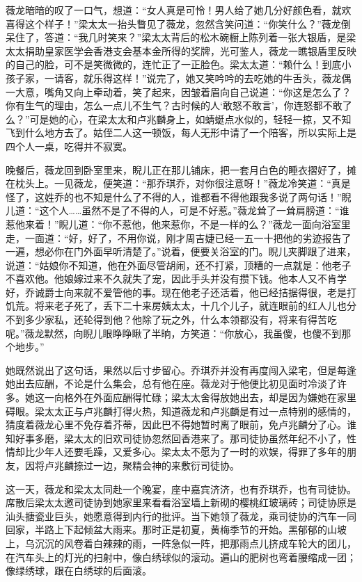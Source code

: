 \par 薇龙暗暗的叹了一口气，想道：“女人真是可怜！男人给了她几分好颜色看，就欢喜得这个样子！”梁太太一抬头瞥见了薇龙，忽然含笑问道：“你笑什么？”薇龙倒呆住了，答道：“我几时笑来？”梁太太背后的松木碗橱上陈列着一张大银盾，是梁太太捐助皇家医学会香港支会基本金所得的奖牌，光可鉴人，薇龙一瞧银盾里反映的自己的脸，可不是笑微微的，连忙正了一正脸色。梁太太道：“赖什么！到底小孩子家，一请客，就乐得这样！”说完了，她又笑吟吟的去吃她的牛舌头，薇龙偶一大意，嘴角又向上牵动着，笑了起来，因皱着眉向自己说道：“你这是怎么了？你有生气的理由，怎么一点儿不生气？古时候的人‘敢怒不敢言’，你连怒都不敢了么？”可是她的心，在梁太太和卢兆麟身上，如蜻蜓点水似的，轻轻一掠，又不知飞到什么地方去了。姑侄二人这一顿饭，每人无形中请了一个陪客，所以实际上是四个人一桌，吃得并不寂寞。
\par 晚餐后，薇龙回到卧室里来，睨儿正在那儿铺床，把一套月白色的睡衣摺好了，摊在枕头上。一见薇龙，便笑道：“那乔琪乔，对你很注意呀！”薇龙冷笑道：“真是怪了，这姓乔的也不知是什么了不得的人，谁都看不得他跟我多说了两句话！”睨儿道：“这个人……虽然不是了不得的人，可是不好惹。”薇龙耸了一耸肩膀道：“谁惹他来着！”睨儿道：“你不惹他，他来惹你，不是一样的么？”薇龙一面向浴室里走，一面道：“好，好了，不用你说，刚才周吉婕已经一五一十把他的劣迹报告了一遍，想必你在门外面早听清楚了。”说着，便要关浴室的门。睨儿夹脚跟了进来，说道：“姑娘你不知道，他在外面尽管胡闹，还不打紧，顶糟的一点就是：他老子不喜欢他。他娘嫁过来不久就失了宠，因此手头并没有攒下钱。他本人又不肯学好，乔诚爵士向来就不爱管他的事。现在他老子还活着，他已经拮据得很，老是打饥荒。将来老子死了，丢下二十来房姨太太，十几个儿子，就连眼前的红人儿也分不到多少家私，还轮得到他？他除了玩之外，什么本领都没有，将来有得苦吃呢。”薇龙默然，向睨儿眼睁睁瞅了半晌，方笑道：“你放心，我虽傻，也傻不到那个地步。”
\par 她既然说出了这句话，果然以后寸步留心。乔琪乔并没有再度闯入梁宅，但是每逢她出去应酬，不论是什么集会，总有他在座。薇龙对于他便比初见面时冷淡了许多。她这一向格外在外面应酬得忙碌；梁太太舍得放她出去，却是因为嫌她在家里碍眼。梁太太正与卢兆麟打得火热，知道薇龙和卢兆麟是有过一点特别的感情的，猜度着薇龙心里不免存着芥蒂，因此巴不得她暂时离了眼前，免卢兆麟分了心。谁知好事多磨，梁太太的旧欢司徒协忽然回香港来了。那司徒协虽然年纪不小了，性情却比少年人还要毛躁，又爱多心。梁太太不愿为了一时的欢娱，得罪了多年的朋友，因将卢兆麟捺过一边，聚精会神的来敷衍司徒协。
\par 这一天，薇龙和梁太太同赴一个晚宴，座中嘉宾济济，也有乔琪乔，也有司徒协。席散后梁太太邀司徒协到她家里来看看浴室墙上新砌的樱桃红玻璃砖；司徒协原是汕头搪瓷业巨头，她愿意得到内行的批评。当下她领了薇龙，乘司徒协的汽车一同回家，半路上下起倾盆大雨来。那时正是初夏，黄梅季节的开始。黑郁郁的山坡上，乌沉沉的风卷着白辣辣的雨，一阵急似一阵，把那雨点儿挤成车轮大的团儿，在汽车头上的灯光的扫射中，像白绣球似的滚动。遍山的肥树也弯着腰缩成一团；像绿绣球，跟在白绣球的后面滚。
